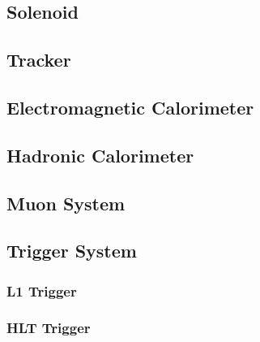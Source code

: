 \subsection{Solenoid}

\subsection{Tracker}

\subsection{Electromagnetic Calorimeter} \label{sec:cms_ecal}

\subsection{Hadronic Calorimeter}

\subsection{Muon System}

\subsection{Trigger System} \label{sec:cms_trigger}

\subsubsection{L1 Trigger}

\subsubsection{HLT Trigger}
